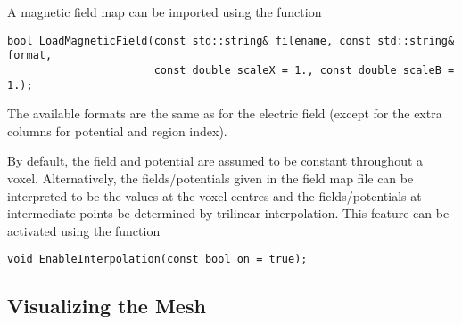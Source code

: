 A magnetic field map can be imported using the function
\begin{lstlisting}
bool LoadMagneticField(const std::string& filename, const std::string& format,
                       const double scaleX = 1., const double scaleB = 1.);
\end{lstlisting}
The available formats are the same as for the electric field (except for the 
extra columns for potential and region index).

By default, the field and potential are assumed to be constant throughout 
a voxel. Alternatively, the fields/potentials given in the field map file
can be interpreted to be the values at the voxel centres and the 
fields/potentials at intermediate points be determined by trilinear interpolation.
This feature can be activated using the function
\begin{lstlisting}
void EnableInterpolation(const bool on = true);
\end{lstlisting} 
 
\subsection{Visualizing the Mesh}

